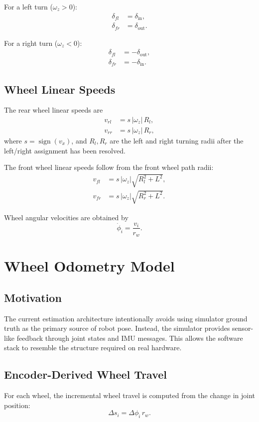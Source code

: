 \documentclass[12pt,a4paper]{report}
\begin{document}
For a left turn (\(\omega_z > 0\)):
\begin{align}
\delta_{fl} &= \delta_{\text{in}}, \\
\delta_{fr} &= \delta_{\text{out}}.
\end{align}

For a right turn (\(\omega_z < 0\)):
\begin{align}
\delta_{fl} &= -\delta_{\text{out}}, \\
\delta_{fr} &= -\delta_{\text{in}}.
\end{align}

\section{Wheel Linear Speeds}
The rear wheel linear speeds are
\begin{align}
v_{rl} &= s \, |\omega_z| \, R_l, \\
v_{rr} &= s \, |\omega_z| \, R_r,
\end{align}
where \(s = \operatorname{sign}(v_x)\), and \(R_l, R_r\) are the left and right turning radii after the left/right assignment has been resolved.

The front wheel linear speeds follow from the front wheel path radii:
\begin{align}
v_{fl} &= s \, |\omega_z| \sqrt{R_l^2 + L^2}, \\
v_{fr} &= s \, |\omega_z| \sqrt{R_r^2 + L^2}.
\end{align}

Wheel angular velocities are obtained by
\begin{equation}
\dot{\phi}_i = \frac{v_i}{r_w}.
\end{equation}

\chapter{Wheel Odometry Model}

\section{Motivation}
The current estimation architecture intentionally avoids using simulator ground truth as the primary source of robot pose. Instead, the simulator provides sensor-like feedback through joint states and IMU messages. This allows the software stack to resemble the structure required on real hardware.

\section{Encoder-Derived Wheel Travel}
For each wheel, the incremental wheel travel is computed from the change in joint position:
\begin{equation}
\Delta s_i = \Delta \phi_i \, r_w.
\end{equation}
\end{document}
